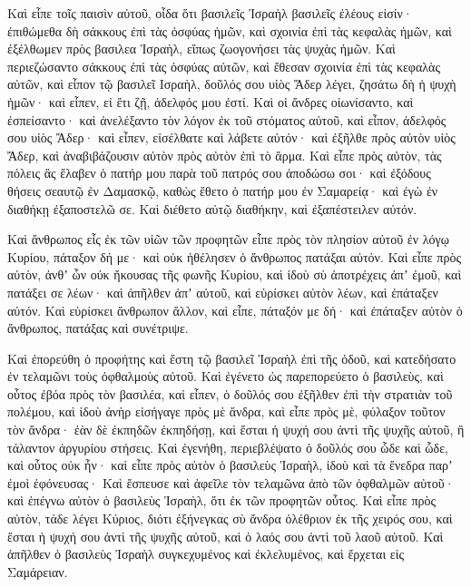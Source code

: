 {\par }{\PP {}Καὶ εἶπε τοῖς παισὶν αὐτοῦ, οἶδα ὅτι βασιλεῖς Ἰσραὴλ βασιλεῖς ἐλέους εἰσίν· ἐπιθώμεθα δὴ σάκκους ἐπὶ τὰς ὀσφύας ἡμῶν, καὶ σχοινία ἐπὶ τὰς κεφαλὰς ἡμῶν, καὶ ἐξέλθωμεν πρὸς βασιλεα Ἰσραὴλ, εἴπως ζωογονήσει τὰς ψυχὰς ἡμῶν.
Καὶ περιεζώσαντο σάκκους ἐπὶ τὰς ὀσφύας αὐτῶν, καὶ ἔθεσαν σχοινία ἐπὶ τὰς κεφαλὰς αὐτῶν, καὶ εἶπον τῷ βασιλεῖ Ισραὴλ, δοῦλός σου υἱὸς Ἄδερ λέγει, ζησάτω δὴ ἡ ψυχὴ ἡμῶν· καὶ εἶπεν, εἰ ἔτι ζῇ, ἀδελφός μου ἐστί.
Καὶ οἱ ἄνδρες οἰωνίσαντο, καὶ ἐσπείσαντο· καὶ ἀνελέξαντο τὸν λόγον ἐκ τοῦ στόματος αὐτοῦ, καὶ εἶπον, ἀδελφός σου υἱὸς Ἄδερ· καὶ εἶπεν, εἰσέλθατε καὶ λάβετε αὐτόν· καὶ ἐξῆλθε πρὸς αὐτὸν υἱὸς Ἄδερ, καὶ ἀναβιβάζουσιν αὐτὸν πρὸς αὐτὸν ἐπὶ τὸ ἅρμα.
Καὶ εἶπε πρὸς αὐτὸν, τὰς πόλεις ἃς ἔλαβεν ὁ πατήρ μου παρὰ τοῦ πατρός σου ἀποδώσω σοι· καὶ ἐξόδους θήσεις σεαυτῷ ἐν Δαμασκῷ, καθὼς ἔθετο ὁ πατήρ μου ἐν Σαμαρείᾳ· καὶ ἐγὼ ἐν διαθήκῃ ἐξαποστελῶ σε. Καὶ διέθετο αὐτῷ διαθήκην, καὶ ἐξαπέστειλεν αὐτόν.
\par }{\PP {}Καὶ ἄνθρωπος εἷς ἐκ τῶν υἱῶν τῶν προφητῶν εἶπε πρὸς τὸν πλησίον αὐτοῦ ἐν λόγῳ Κυρίου, πάταξον δή με· καὶ οὐκ ἠθέλησεν ὁ ἄνθρωπος πατάξαι αὐτόν.
Καὶ εἶπε πρὸς αὐτὸν, ἀνθʼ ὧν οὐκ ἤκουσας τῆς φωνῆς Κυρίου, καὶ ἰδοὺ σὺ ἀποτρέχεις ἀπʼ ἐμοῦ, καὶ πατάξει σε λέων· καὶ ἀπῆλθεν ἀπʼ αὐτοῦ, καὶ εὑρίσκει αὐτὸν λέων, καὶ ἐπάταξεν αὐτόν.
Καὶ εὑρίσκει ἄνθρωπον ἄλλον, καὶ εἶπε, πάταξόν με δή· καὶ ἐπάταξεν αὐτὸν ὁ ἄνθρωπος, πατάξας καὶ συνέτριψε.
\par }{\PP {}Καὶ ἐπορεύθη ὁ προφήτης καὶ ἔστη τῷ βασιλεῖ Ἰσραὴλ ἐπὶ τῆς ὁδοῦ, καὶ κατεδήσατο ἐν τελαμῶνι τοὺς ὀφθαλμοὺς αὐτοῦ.
Καὶ ἐγένετο ὡς παρεπορεύετο ὁ βασιλεὺς, καὶ οὗτος ἐβόα πρὸς τὸν βασιλέα, καὶ εἶπεν, ὁ δοῦλός σου ἐξῆλθεν ἐπὶ τὴν στρατιὰν τοῦ πολέμου, καὶ ἰδοὺ ἀνὴρ εἰσήγαγε πρὸς μὲ ἄνδρα, καὶ εἶπε πρὸς μὲ, φύλαξον τοῦτον τὸν ἄνδρα· ἐὰν δὲ ἐκπηδῶν ἐκπηδήσῃ, καὶ ἔσται ἡ ψυχή σου ἀντὶ τῆς ψυχῆς αὐτοῦ, ἢ τάλαντον ἀργυρίου στήσεις.
Καὶ ἐγενήθη, περιεβλέψατο ὁ δοῦλός σου ὧδε καὶ ὧδε, καὶ οὗτος οὐκ ἦν· καὶ εἶπε πρὸς αὐτὸν ὁ βασιλεὺς Ἰσραὴλ, ἰδοὺ καὶ τὰ ἔνεδρα παρʼ ἐμοὶ ἐφόνευσας·
Καὶ ἔσπευσε καὶ ἀφεῖλε τὸν τελαμῶνα ἀπὸ τῶν ὀφθαλμῶν αὐτοῦ· καὶ ἐπέγνω αὐτὸν ὁ βασιλεὺς Ἰσραὴλ, ὅτι ἐκ τῶν προφητῶν οὗτος.
Καὶ εἶπε πρὸς αὐτὸν, τάδε λέγει Κύριος, διότι ἐξήνεγκας σὺ ἄνδρα ὀλέθριον ἐκ τῆς χειρός σου, καὶ ἔσται ἡ ψυχή σου ἀντὶ τῆς ψυχῆς αὐτοῦ, καὶ ὁ λαός σου ἀντὶ τοῦ λαοῦ αὐτοῦ.
Καὶ ἀπῆλθεν ὁ βασιλεὺς Ἰσραὴλ συγκεχυμένος καὶ ἐκλελυμένος, καὶ ἔρχεται εἰς Σαμάρειαν.

}
